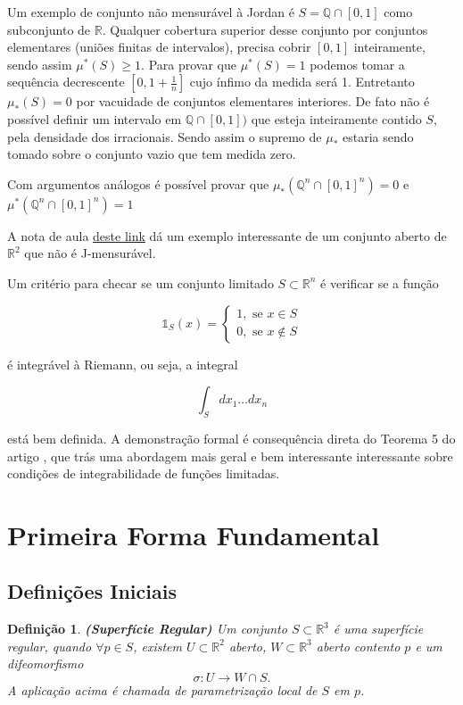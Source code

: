\documentclass[12pt,letterpaper]{article}
\newtheorem{defi}{Definição}
\newcommand{\real}{\mathbb{R}}
\newcommand{\one}{\mathds{1}}
\newcommand{\rr}{\mathbb{R}^2}
\newcommand{\rn}{\mathbb{R}^n}
\newcommand{\Int}{\displaystyle\int}
\begin{document}
	Um exemplo de conjunto não mensurável à Jordan é $S=\mathbb{Q}\cap[0,1]$ como subconjunto de $\real$.
	Qualquer cobertura superior desse conjunto por conjuntos elementares (uniões finitas de intervalos), precisa cobrir $[0,1]$ inteiramente, sendo assim $\mu^{*}(S)\geq1$. Para provar que $\mu^{*}(S)=1$ podemos tomar a sequência decrescente $[0,1+\frac1n]$ cujo ínfimo da medida será 1.
	Entretanto $\mu_{*}(S)=0$ por vacuidade de conjuntos elementares interiores. De fato não é possível definir um intervalo em $\mathbb{Q}\cap[0,1])$ que esteja inteiramente contido $S$, pela densidade dos irracionais. Sendo assim o supremo de $\mu_{*}$ estaria sendo tomado sobre o conjunto vazio que tem medida zero.
	
	Com argumentos análogos é possível provar que $\mu_{*}(\mathbb{Q}^n\cap[0,1]^n)=0$ e $\mu^{*}(\mathbb{Q}^n\cap[0,1]^n)=1$
	
	A nota de aula \href{https://www2.math.upenn.edu/~kazdan/509S07/jordan-meas.pdf}{deste link} dá um exemplo interessante de um conjunto aberto de $\rr$ que não é J-mensurável.
	
	Um critério para checar se um conjunto limitado $S\subset \rn$ é verificar se a função 
	
	$$\one_S(x)=\begin{cases}1,\text{ se }x\in S\\0,\text{ se }x \notin S\end{cases}$$
	
	é integrável à Riemann, ou seja, a integral 
	
	$$\Int_Sdx_1\ldots dx_n$$
	
	está bem definida. A demonstração formal é consequência direta do Teorema 5 do artigo \cite{frink}, que trás uma abordagem mais geral e bem interessante interessante sobre condições de integrabilidade de funções limitadas.  
	
	
\section{Primeira Forma Fundamental}
	\label{fff}
	\subsection{Definições Iniciais}
	\begin{defi}
		 \textbf{(Superfície Regular)\cite{ronaldo}} Um conjunto $S\subset\real^3$ é uma superfície regular, quando $\forall p\in S$, existem $U\subset\rr$ aberto, $W\subset\real^3$ aberto contento $p$ e um difeomorfismo 
		$$\sigma:U\to W\cap S.$$
	A aplicação acima é chamada de parametrização local de $S$ em $p$.
	\end{defi}
	
\end{document}
